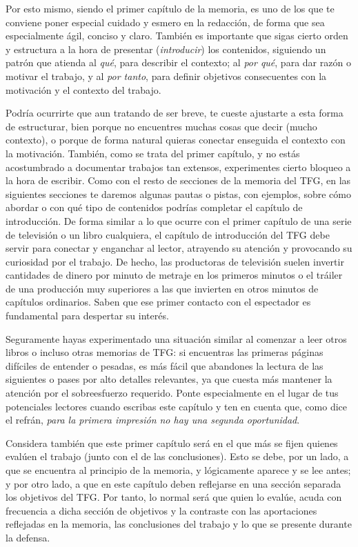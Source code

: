 Por esto mismo, siendo el primer capítulo de la memoria, es uno de los que te conviene poner especial cuidado y esmero en la redacción, de forma que sea especialmente ágil, conciso y claro. También es importante que sigas cierto orden y estructura a la hora de presentar (\textit{introducir}) los contenidos, siguiendo un patrón que atienda al \textit{qué}, para describir el contexto; al \textit{por qué}, para dar razón o motivar el trabajo, y al \textit{por tanto}, para definir objetivos consecuentes con la motivación y el contexto del trabajo.

Podría ocurrirte que aun tratando de ser breve, te cueste ajustarte a esta forma de estructurar, bien porque no encuentres muchas cosas que decir (mucho contexto), o porque de forma natural quieras conectar enseguida el contexto con la motivación. También, como se trata del primer capítulo, y no estás acostumbrado a documentar trabajos tan extensos, experimentes cierto bloqueo a la hora de escribir. Como con el resto de secciones de la memoria del TFG, en las siguientes secciones te daremos algunas pautas o pistas, con ejemplos, sobre cómo abordar o con qué tipo de contenidos podrías completar el capítulo de introducción. De forma similar a lo que ocurre con el primer capítulo de una serie de televisión o un libro cualquiera, el capítulo de introducción del TFG debe servir para conectar y enganchar al lector, atrayendo su atención y provocando su curiosidad por el trabajo. De hecho, las productoras de televisión suelen invertir cantidades de dinero por minuto de metraje en los primeros minutos o el tráiler de una producción muy superiores a las que invierten en otros minutos de capítulos ordinarios. Saben que ese primer contacto con el espectador es fundamental para despertar su interés.


Seguramente hayas experimentado una situación similar al comenzar a leer otros libros o incluso otras memorias de TFG: si encuentras las primeras páginas difíciles de entender o pesadas, es más fácil que abandones la lectura de las siguientes o pases por alto detalles relevantes, ya que cuesta más mantener la atención por el sobreesfuerzo requerido. Ponte especialmente en el lugar de tus potenciales lectores cuando escribas este capítulo y ten en cuenta que, como dice el refrán, \textit{para la primera impresión no hay una segunda oportunidad}.

Considera también que este primer capítulo será en el que más se fijen quienes evalúen el trabajo (junto con el de las conclusiones). Esto se debe, por un lado, a que se encuentra al principio de la memoria, y lógicamente aparece y se lee antes; y por otro lado, a que en este capítulo deben reflejarse en una sección separada los objetivos del TFG. Por tanto, lo normal será que quien lo evalúe, acuda con frecuencia a dicha sección de objetivos y la contraste con las aportaciones reflejadas en la memoria, las conclusiones del trabajo y lo que se presente durante la defensa. 

